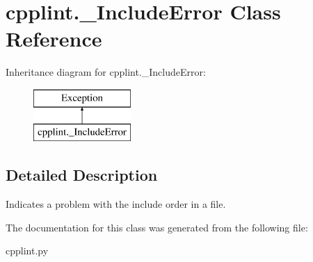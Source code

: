 \hypertarget{classcpplint_1_1__IncludeError}{}\section{cpplint.\+\_\+\+Include\+Error Class Reference}
\label{classcpplint_1_1__IncludeError}
Inheritance diagram for cpplint.\+\_\+\+Include\+Error\+:\begin{figure}[H]
\begin{center}
\leavevmode
\includegraphics[height=2.000000cm]{classcpplint_1_1__IncludeError}
\end{center}
\end{figure}


\subsection{Detailed Description}
\begin{DoxyVerb}Indicates a problem with the include order in a file.\end{DoxyVerb}
 

The documentation for this class was generated from the following file\+:\begin{DoxyCompactItemize}
\item 
cpplint.\+py\end{DoxyCompactItemize}
